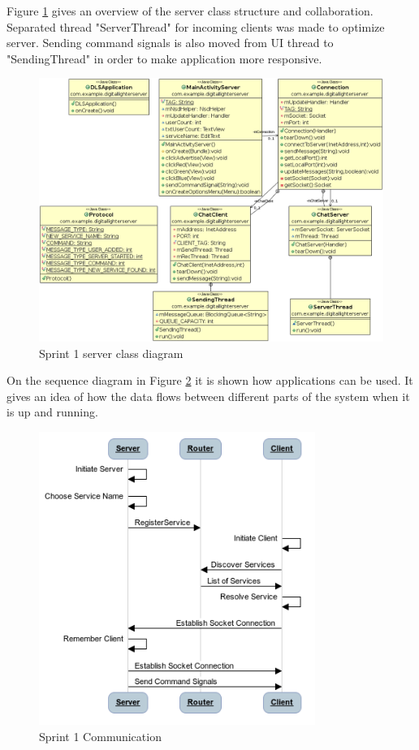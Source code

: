 Figure \ref{fig:class_diagram_server} gives an overview of the server class structure and collaboration. Separated thread "ServerThread" for incoming clients was made to optimize server. Sending command signals is also moved from UI thread to "SendingThread" in order to make application more responsive.

\begin{figure}[H]
	\centering
		\includegraphics[width=16.2cm]{sprint1/class_diagram_server.png}
	\caption{Sprint 1 server class diagram}
	\label{fig:class_diagram_server}
\end{figure}

On the sequence diagram in Figure \ref{fig:sprint1_communication} it is shown how applications can be used. It gives an idea of how the data flows between different parts of the system when it is up and running.

\begin{figure}[H]
	\centering
		\includegraphics[width=9cm]{sprint1/communication.png}
	\caption{Sprint 1 Communication}
	\label{fig:sprint1_communication}
\end{figure}

